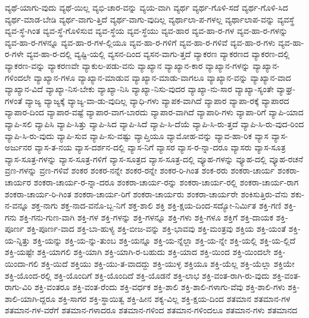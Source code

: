 {ವ್ಯಥೆ-ಯಾಗು-ವುದು
ವ್ಯಥೆ-ಯಿಲ್ಲ
ವ್ಯಭಿ-ಚಾರ-ವನ್ನು
ವ್ಯಯ-ವಾಗಿ
ವ್ಯರ್ಥ
ವ್ಯರ್ಥ-ಗೊಳಿ-ಸದೆ
ವ್ಯರ್ಥ-ಗೊಳಿ-ಸಿದ
ವ್ಯರ್ಥ-ಮಾಡ-ಬೇಡಿ
ವ್ಯರ್ಥ-ವಾಗು-ತ್ತಿದೆ
ವ್ಯರ್ಥ-ವಾಗು-ವುದಿಲ್ಲ
ವ್ಯರ್ಥಾಲಾ-ಪ-ಗಳಲ್ಲ
ವ್ಯರ್ಥಾಲಾಪ-ವನ್ನು
ವ್ಯವಸ್ಥೆ
ವ್ಯವ-ಸ್ಥೆ-ಗಿಂತ
ವ್ಯವ-ಸ್ಥೆ-ಗೊಳಿಸುವ
ವ್ಯವ-ಸ್ಥೆಯ
ವ್ಯವ-ಸ್ಥೆಯು
ವ್ಯವ-ಹಾರ
ವ್ಯವ-ಹಾ-ರ-ಗಳ
ವ್ಯವ-ಹಾ-ರ-ಗಳನ್ನು
ವ್ಯವ-ಹಾ-ರ-ಗಳನ್ನೂ
ವ್ಯವ-ಹಾ-ರ-ಗಳ-ಲ್ಲಿಯೂ
ವ್ಯವ-ಹಾ-ರ-ಗಳಿಗೆ
ವ್ಯವ-ಹಾ-ರ-ಗಳಿವೆ
ವ್ಯವ-ಹಾ-ರ-ಗಳು
ವ್ಯವ-ಹಾ-ರ-ಗಳೇ
ವ್ಯವ-ಹಾ-ರ-ದಲ್ಲಿ
ವ್ಯಷ್ಟಿ-ಯಲ್ಲಿ
ವ್ಯಸನ-ದಿಂದ
ವ್ಯಸನ-ವಾಗು-ತ್ತದೆ
ವ್ಯಾಕರಣ
ವ್ಯಾಕರಣದ
ವ್ಯಾಕರಣ-ದಲ್ಲಿ
ವ್ಯಾಕರಣ-ವನ್ನು
ವ್ಯಾಕರಣವೇ
ವ್ಯಾಕುಲ-ಪಡು-ವನು
ವ್ಯಾಖ್ಯಾನ
ವ್ಯಾಖ್ಯಾನ-ಕಾರ
ವ್ಯಾಖ್ಯಾನ-ಗಳನ್ನು
ವ್ಯಾಖ್ಯಾನ-ಗಳಿಂದಲೇ
ವ್ಯಾಖ್ಯಾನ-ಗಳೂ
ವ್ಯಾಖ್ಯಾನ-ಮಾಡುವ
ವ್ಯಾಖ್ಯಾನ-ಮಾಡು-ವಾಗಲೂ
ವ್ಯಾಖ್ಯಾನ-ವನ್ನು
ವ್ಯಾಖ್ಯಾನ-ವಾದ
ವ್ಯಾಖ್ಯಾನ-ವಿದೆ
ವ್ಯಾಖ್ಯಾ-ನಿಸ-ಬೇಕು
ವ್ಯಾಖ್ಯಾ-ನಿಸಿ
ವ್ಯಾಖ್ಯಾ-ನಿಸು-ವುದರ
ವ್ಯಾಖ್ಯಾ-ನು-ಸಾರ
ವ್ಯಾಖ್ಯಾ-ಸ್ಯಂತೇ
ವ್ಯಾಘ್ರ-ಗಳಂತೆ
ವ್ಯಾಜ್ಯ
ವ್ಯಾಜ್ಯಕ್ಕೆ
ವ್ಯಾಜ್ಯ-ವಾ-ಡು-ವುದಿಲ್ಲ
ವ್ಯಾಧಿ-ಗಳು
ವ್ಯಾಪಕ-ವಾಗಿದೆ
ವ್ಯಾಪಾರ
ವ್ಯಾಪಾ-ರಕ್ಕೆ
ವ್ಯಾಪಾರದ
ವ್ಯಾಪಾರ-ದಿಂದ
ವ್ಯಾಪಾರ-ವಷ್ಟೆ
ವ್ಯಾಪಾರ-ವಾಗ-ಬಾರದು
ವ್ಯಾಪಾರ-ವಾಗಿದೆ
ವ್ಯಾಪಾರಿ-ಗಳು
ವ್ಯಾಪಾ-ರಿಗೆ
ವ್ಯಾಪಿ-ಯಾದ
ವ್ಯಾಪಿ-ಸಲಿ
ವ್ಯಾಪಿಸಿ
ವ್ಯಾಪಿ-ಸಿತ್ತು
ವ್ಯಾಪಿ-ಸಿದ
ವ್ಯಾಪಿ-ಸಿದೆ
ವ್ಯಾಪಿ-ಸಿ-ದೆಯೆ
ವ್ಯಾಪಿ-ಸಿ-ರು-ತ್ತದೆ
ವ್ಯಾಪಿ-ಸಿ-ರು-ವುದ-ರಿಂದ
ವ್ಯಾಪಿ-ಸಿ-ರು-ವುದು
ವ್ಯಾಪಿ-ಸುವ
ವ್ಯಾಪಿ-ಸು-ವಷ್ಟು
ವ್ಯಾಪ್ತಿಯೂ
ವ್ಯಾಮೋಹ-ವನ್ನು
ವ್ಯಾವ-ಹಾ-ರಿಕ
ವ್ಯಾಸ
ವ್ಯಾಸ-ಅರ್ಜುನರ
ವ್ಯಾಸ-ತ-ನಯ
ವ್ಯಾಸ-ದರ್ಶನ-ದಲ್ಲಿ
ವ್ಯಾಸ-ನಿಗೆ
ವ್ಯಾಸರ
ವ್ಯಾಸ-ರ-ನ್ನಾ-ದರೂ
ವ್ಯಾಸರು
ವ್ಯಾಸ-ಸೂತ್ರ
ವ್ಯಾಸ-ಸೂತ್ರ-ಗಳನ್ನು
ವ್ಯಾಸ-ಸೂತ್ರ-ಗಳಿಗೆ
ವ್ಯಾಸ-ಸೂತ್ರದ
ವ್ಯಾಸ-ಸೂತ್ರ-ದಲ್ಲಿ
ವ್ಯೂಹ-ಗಳನ್ನು
ವ್ಯೂಹ-ದಲ್ಲಿ
ವ್ಯೂಹ-ರಚನೆ
ವ್ರಣ-ಗಳನ್ನು
ವ್ರಣ-ಗಳಿವೆ
ಶಂಕರ
ಶಂಕರ-ನನ್ನೇ
ಶಂಕರ-ರನ್ನೇ
ಶಂಕರ-ರಿ-ಗಿಂತ
ಶಂಕ-ರರು
ಶಂಕರಾ-ಚಾರ್ಯ
ಶಂಕರಾ-ಚಾರ್ಯರ
ಶಂಕರಾ-ಚಾರ್ಯ-ರ-ನ್ನಾ-ದರೂ
ಶಂಕರಾ-ಚಾರ್ಯ-ರನ್ನು
ಶಂಕರಾ-ಚಾರ್ಯ-ರಲ್ಲಿ
ಶಂಕರಾ-ಚಾರ್ಯ-ರಾಗ
ಶಂಕರಾ-ಚಾರ್ಯ-ರಿ-ಗಿಂತ
ಶಂಕರಾ-ಚಾರ್ಯ-ರಿಗೆ
ಶಂಕರಾ-ಚಾರ್ಯರು
ಶಂಕರಾ-ಚಾರ್ಯರೇ
ಶಂಕಿಸುತ್ತಿರು-ವೆನು
ಶಕು-ನ-ವನ್ನೂ
ಶಕ್ತ-ನಾಗು
ಶಕ್ತ-ನಾದ-ವನೊ-ಬ್ಬ-ನಿಗೆ
ಶಕ್ತ-ಶಾಲಿ
ಶಕ್ತಿ
ಶಕ್ತಿ-ಕ್ಷಯ-ದಿಂದ-ಸದ್ಯೋ-ನಿರ್ಮಿತ
ಶಕ್ತಿ-ಗಣಿ
ಶಕ್ತಿ-ಗನು
ಶಕ್ತಿ-ಗನು-ಗುಣ-ವಾಗಿ
ಶಕ್ತಿ-ಗಳ
ಶಕ್ತಿ-ಗಳನ್ನು
ಶಕ್ತಿ-ಗಳನ್ನೂ
ಶಕ್ತಿ-ಗಳು
ಶಕ್ತಿ-ಗಳೂ
ಶಕ್ತಿಗೆ
ಶಕ್ತಿ-ದಾಯಕ
ಶಕ್ತಿ-ಪೂರ್ಣ
ಶಕ್ತಿ-ಪೂರ್ಣ-ವಾದ
ಶಕ್ತಿ-ಬಾ-ಹುಳ್ಯ
ಶಕ್ತಿ-ಬೀಜ-ವನ್ನು
ಶಕ್ತಿ-ಭಾವವು
ಶಕ್ತಿ-ಮಂತ್ರವು
ಶಕ್ತಿಯ
ಶಕ್ತಿ-ಯಂತೆ
ಶಕ್ತಿ-ಯ-ನ್ನಿತ್ತು
ಶಕ್ತಿ-ಯನ್ನು
ಶಕ್ತಿ-ಯ-ನ್ನು-ತುಂಬ
ಶಕ್ತಿ-ಯನ್ನೂ
ಶಕ್ತಿ-ಯ-ನ್ನೆಲ್ಲಾ
ಶಕ್ತಿ-ಯ-ನ್ನೇ
ಶಕ್ತಿ-ಯಲ್ಲಿ
ಶಕ್ತಿ-ಯ-ಲ್ಲಿದೆ
ಶಕ್ತಿ-ಯಷ್ಟೇ
ಶಕ್ತಿ-ಯಾಗಲಿ
ಶಕ್ತಿ-ಯಾಗಿ
ಶಕ್ತಿ-ಯಾಗಿ-ರ-ಬಹುದು
ಶಕ್ತಿ-ಯಾದ
ಶಕ್ತಿ-ಯಿಂದ
ಶಕ್ತಿ-ಯಿಂದಲೇ
ಶಕ್ತಿ-ಯಿಂದಾ-ಗಲಿ
ಶಕ್ತಿ-ಯಿದೆ
ಶಕ್ತಿಯು
ಶಕ್ತಿ-ಯು-ತ-ವಾದದ್ದು
ಶಕ್ತಿ-ಯುಳ್ಳ
ಶಕ್ತಿಯೂ
ಶಕ್ತಿ-ಯೆಲ್ಲ
ಶಕ್ತಿ-ಯೆಲ್ಲಾ
ಶಕ್ತಿಯೇ
ಶಕ್ತಿ-ಯೊಂದ-ರಲ್ಲಿ
ಶಕ್ತಿ-ಯೊಂದಿಗೆ
ಶಕ್ತಿ-ಯೊಂದಿದೆ
ಶಕ್ತಿ-ಯೊಡನೆ
ಶಕ್ತಿ-ಲಾಭ
ಶಕ್ತಿ-ವಂತ-ರಾಗಿ-ರು-ವುದು
ಶಕ್ತಿ-ವಂತ-ರಾಗು-ವಿರಿ
ಶಕ್ತಿ-ವಂತರೂ
ಶಕ್ತಿ-ವಂತ-ರೆಂದು
ಶಕ್ತಿ-ವರ್ಧಕ
ಶಕ್ತಿ-ಶಾಲಿ
ಶಕ್ತಿ-ಶಾಲಿ-ಗಳಾಗು-ವೆವು
ಶಕ್ತಿ-ಶಾಲಿ-ಗಳು
ಶಕ್ತಿ-ಶಾಲಿ-ಯಾಗಿ-ದ್ದರೂ
ಶಕ್ತಿ-ಸಾಗರ
ಶಕ್ತಿ-ಸ್ಥಾಯಿತ್ವ
ಶಕ್ತಿ-ಹೀನ
ಶಕ್ಯ-ವಿಲ್ಲ
ಶಕ್ತಿ-ಕ್ಷಯ-ದಿಂದ
ಶತಮಾನ
ಶತಮಾನ-ಗಳ
ಶತಮಾನ-ಗಳ-ವರೆಗೆ
ಶತಮಾನ-ಗಳಾದರೂ
ಶತಮಾನ-ಗಳಿಂದ
ಶತಮಾನ-ಗಳಿಂದಲೂ
ಶತಮಾನ-ಗಳು
ಶತಮಾನದ
}
